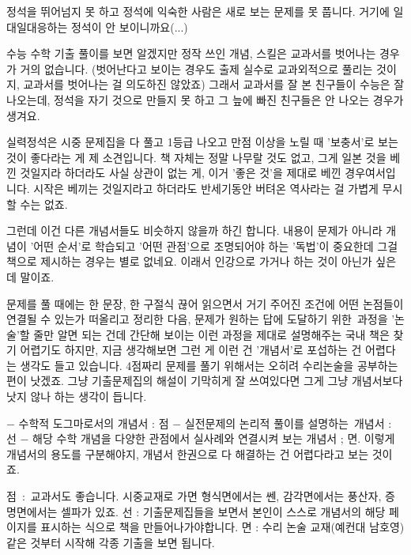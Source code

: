 정석을 뛰어넘지 못 하고 정석에 익숙한 사람은 새로 보는 문제를 못 풉니다. 거기에 일대일대응하는 정석이 안 보이니까요(...)
\vspace{5mm}

수능 수학 기출 풀이를 보면 알겠지만 정작 쓰인 개념, 스킬은 교과서를 벗어나는 경우가 거의 없습니다.
(벗어난다고 보이는 경우도 출제 실수로 교과외적으로 풀리는 것이지, 교과서를 벗어나는 걸 의도하진 않았죠)
그래서 교과서를 잘 본 친구들이 수능은 잘 나오는데, 정석을 자기 것으로 만들지 못 하고 그 늪에 빠진 친구들은 안 나오는 경우가 생겨요.
\vspace{5mm}

실력정석은 시중 문제집을 다 풀고 1등급 나오고 만점 이상을 노릴 때 '보충서'로 보는 것이 좋다라는 게 제 소견입니다.
책 자체는 정말 나무랄 것도 없고, 그게 일본 것을 베낀 것일지라 하더라도 사실 상관이 없는 게, 이거 '좋은 것'을 제대로 베낀 경우여서입니다.
시작은 베끼는 것일지라고 하더라도 반세기동안 버텨온 역사라는 걸 가볍게 무시할 수는 없죠.
\vspace{5mm}

그런데 이건 다른 개념서들도 비슷하지 않을까 하긴 합니다.
내용이 문제가 아니라 개념이 '어떤 순서'로 학습되고 '어떤 관점'으로 조명되어야 하는 '독법'이 중요한데
그걸 책으로 제시하는 경우는 별로 없네요. 이래서 인강으로 가거나 하는 것이 아닌가 싶은데 말이죠.
\vspace{5mm}

문제를 풀 때에는 한 문장, 한 구절식 끊어 읽으면서 거기 주어진 조건에 어떤 논점들이 연결될 수 있는가 떠올리고 정리한 다음,
문제가 원하는 답에 도달하기 위한 과정을 '논술'할 줄만 알면 되는 건데
간단해 보이는 이런 과정을 제대로 설명해주는 국내 책은 찾기 어렵기도 하지만,
지금 생각해보면 그런 게 이런 건 '개념서'로 포섭하는 건 어렵다는 생각도 들고 있습니다.
4점짜리 문제를 풀기 위해서는 오히려 수리논술을 공부하는 편이 낫겠죠.
그냥 기출문제집의 해설이 기막히게 잘 쓰여있다면 그게 그냥 개념서보다 낫지 않나 하는 생각이 듭니다.
\vspace{5mm}

$-$ 수학적 도그마로서의 개념서 : 점
$-$ 실전문제의 논리적 풀이를 설명하는 개념서 : 선
$-$ 해당 수학 개념을 다양한 관점에서 실사례와 연결시켜 보는 개념서 ; 면.
이렇게 개념서의 용도를 구분해야지, 개념서 한권으로 다 해결하는 건 어렵다라고 보는 것이죠.
\vspace{5mm}

점 : 교과서도 좋습니다. 시중교재로 가면 형식면에서는 쎈, 감각면에서는 풍산자, 증명면에서는 셀파가 있죠.
선 : 기출문제집들을 보면서 본인이 스스로 개념서의 해당 페이지를 표시하는 식으로 책을 만들어나가야합니다.
면 : 수리 논술 교재(예컨대 남호영) 같은 것부터 시작해 각종 기출을 보면 됩니다.
\vspace{5mm}

